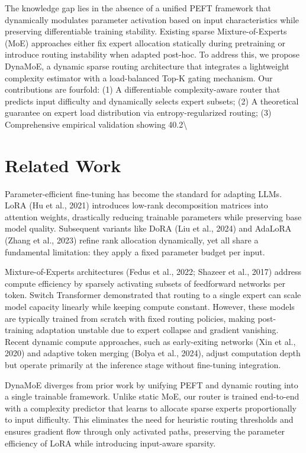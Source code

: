 \documentclass[11pt,a4paper]{article}
\begin{document}
The knowledge gap lies in the absence of a unified PEFT framework that dynamically modulates parameter activation based on input characteristics while preserving differentiable training stability. Existing sparse Mixture-of-Experts (MoE) approaches either fix expert allocation statically during pretraining or introduce routing instability when adapted post-hoc. To address this, we propose DynaMoE, a dynamic sparse routing architecture that integrates a lightweight complexity estimator with a load-balanced Top-K gating mechanism. Our contributions are fourfold: (1) A differentiable complexity-aware router that predicts input difficulty and dynamically selects expert subsets; (2) A theoretical guarantee on expert load distribution via entropy-regularized routing; (3) Comprehensive empirical validation showing 40.2\textbackslash{}%

\section{Related Work}
Parameter-efficient fine-tuning has become the standard for adapting LLMs. LoRA (Hu et al., 2021) introduces low-rank decomposition matrices into attention weights, drastically reducing trainable parameters while preserving base model quality. Subsequent variants like DoRA (Liu et al., 2024) and AdaLoRA (Zhang et al., 2023) refine rank allocation dynamically, yet all share a fundamental limitation: they apply a fixed parameter budget per input. 

Mixture-of-Experts architectures (Fedus et al., 2022; Shazeer et al., 2017) address compute efficiency by sparsely activating subsets of feedforward networks per token. Switch Transformer demonstrated that routing to a single expert can scale model capacity linearly while keeping compute constant. However, these models are typically trained from scratch with fixed routing policies, making post-training adaptation unstable due to expert collapse and gradient vanishing. Recent dynamic compute approaches, such as early-exiting networks (Xin et al., 2020) and adaptive token merging (Bolya et al., 2024), adjust computation depth but operate primarily at the inference stage without fine-tuning integration. 

DynaMoE diverges from prior work by unifying PEFT and dynamic routing into a single trainable framework. Unlike static MoE, our router is trained end-to-end with a complexity predictor that learns to allocate sparse experts proportionally to input difficulty. This eliminates the need for heuristic routing thresholds and ensures gradient flow through only activated paths, preserving the parameter efficiency of LoRA while introducing input-aware sparsity.
\end{document}
